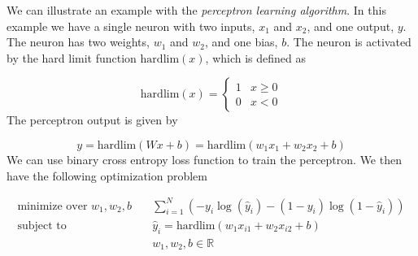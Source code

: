 We can illustrate an example with the \textit{perceptron learning algorithm}. In this example we have a single neuron with two inputs, $x_1$ and $x_2$, and one output, $y$. The neuron has two weights, $w_1$ and $w_2$, and one bias, $b$. The neuron is activated by the hard limit function $\text{hardlim}(x)$, which is defined as

\begin{equation}
    \text{hardlim}(x) = \begin{cases}
        1 & x \geq 0 \\
        0 & x < 0
    \end{cases}
\end{equation}
%
The perceptron output is given by

\begin{equation}
    y = \text{hardlim}(Wx+b) = \text{hardlim}(w_1x_1+w_2x_2+b)
\end{equation}
%
We can use binary cross entropy loss function to train the perceptron. We then have the following optimization problem

\begin{equation}
    \begin{aligned}
        \text{minimize over $w_1,w_2,b$} &\quad \sum_{i=1}^N \left(-y_i\log(\hat{y}_i) - (1-y_i)\log(1-\hat{y}_i)\right) \\
        \text{subject to} &\quad \hat{y}_i = \text{hardlim}(w_1x_{i1}+w_2x_{i2}+b) \\
        &\quad w_1,w_2,b \in \mathbb{R}
    \end{aligned}
\end{equation}
